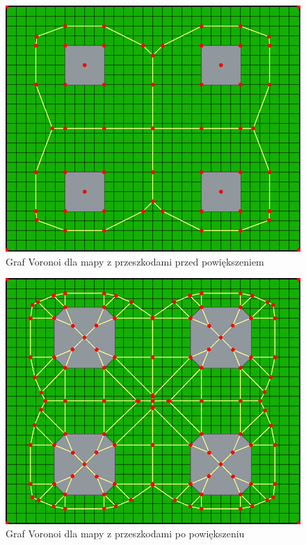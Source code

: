 \documentclass[a4paper,11pt,twoside]{report}
\theoremstyle{definition}
\begin{document}
\begin{figure}[h!]
\centering
\includegraphics[scale=0.4]{voronoiGraphForMap}
\caption[Graf Voronoi dla mapy z przeszkodami przed powiększeniem]{Graf Voronoi dla mapy z przeszkodami przed powiększeniem}
\end{figure}

\begin{figure}[h!]
\centering
\includegraphics[scale=0.4]{voronoiGraphForExpandedMap}
\caption[Graf Voronoi dla mapy z przeszkodami po powiększeniu]{Graf Voronoi dla mapy z przeszkodami po powiększeniu}
\end{figure}
\end{document}
